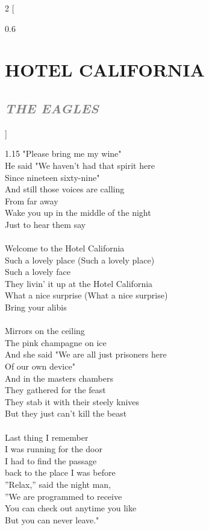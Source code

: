 \documentclass[100pt,a4paper]{report}
\newenvironment{song2}[2]
	{	
    	\begin{multicols*}{2}
		[
			\begin{spacing}{0.6}
				\section*{\LARGE\centering \MakeUppercase{\textbf{{#1}}}}
				\subsection*{\Large\centering \textit{\textcolor{gray}{\MakeUppercase{{#2}}}}}
			\end{spacing}
		]
		\Large
	}
	{
	\end{multicols*}
	\newpage
    }
\begin{document}
\begin{song2}{Hotel California}{The Eagles}
\begin{spacing}{1.15}
"Please bring me my wine"\\
He said "We haven't had that spirit here\\ 
Since nineteen sixty-nine"\\
And still those voices are calling\\ 
From far away\\
Wake you up in the middle of the night\\ 
Just to hear them say\\
\\
Welcome to the Hotel California\\
Such a lovely place (Such a lovely place)\\ 
Such a lovely face\\
They livin' it up at the Hotel California\\
What a nice surprise (What a nice surprise)\\
Bring your alibis\\
\\
Mirrors on the ceiling\\
The pink champagne on ice\\
And she said "We are all just prisoners here\\ 
Of our own device"\\
And in the masters chambers\\ 
They gathered for the feast\\
They stab it with their steely knives\\
But they just can't kill the beast\\
\\
Last thing I remember \\
I was running for the door\\
I had to find the passage\\ 
back to the place I was before\\
''Relax,'' said the night man,\\ 
''We are programmed to receive\\
You can check out anytime you like\\ 
But you can never leave."
\end{spacing}
\end{song2}
\end{document}
